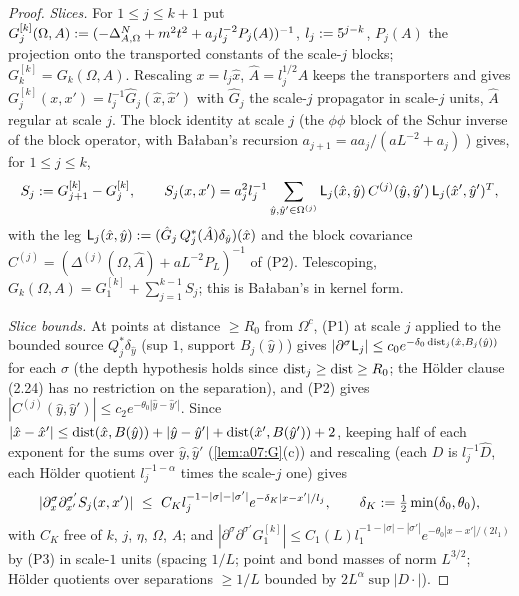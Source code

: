 \begin{proof}
\emph{Slices.} For $1\le j\le k+1$ put $G^{[k]}_j(\Omega,A):=(-\Delta^N_{A,\Omega}+m^2t^2+a_jl_j^{-2}P_j(A))^{-1}$, $l_j:=5^{j-k}$, $P_j(A)$ the projection onto the transported constants of the scale-$j$ blocks; $G^{[k]}_k=G_k(\Omega,A)$. Rescaling $x=l_j\hat x$, $\hat A=l_j^{1/2}A$ keeps the transporters and gives $G^{[k]}_j(x,x')=l_j^{-1}\hat G_j(\hat x,\hat x')$ with $\hat G_j$ the scale-$j$ propagator in scale-$j$ units, $\hat A$ regular at scale $j$. The block identity at scale $j$ (the $\phi\phi$ block of the Schur inverse of the block operator, with Ba{\l}aban's recursion $a_{j+1}=aa_j/(aL^{-2}+a_j)$ \cite[p.~609]{Ba1}) gives, for $1\le j\le k$,
\[
S_j:= G^{[k]}_{j+1}-G^{[k]}_j,\qquad S_j(x,x')=a_j^2l_j^{-1}\sum_{\hat y,\hat y'\in\Omega^{(j)}}\mathsf L_j(\hat x,\hat y)\,C^{(j)}(\hat y,\hat y')\,\mathsf L_j(\hat x',\hat y')^{T},
\]
with the leg $\mathsf L_j(\hat x,\hat y):=(\hat G_j\,Q_j^*(\hat A)\delta_{\hat y})(\hat x)$ and the block covariance $C^{(j)}=(\Delta^{(j)}(\Omega,\hat A)+aL^{-2}P_L)^{-1}$ of (P2). Telescoping, $G_k(\Omega,A)=G^{[k]}_1+\sum_{j=1}^{k-1}S_j$; this is Ba{\l}aban's \cite[(2.6), p.~424]{Ba3} in kernel form.

\emph{Slice bounds.} At points at distance $\ge R_0$ from $\Omega^c$, (P1) at scale $j$ applied to the bounded source $Q_j^*\delta_{\hat y}$ (sup $1$, support $B_j(\hat y)$) gives $|\partial^\sigma\mathsf L_j|\le c_0e^{-\delta_0\operatorname{dist}_j(\hat x,B_j(\hat y))}$ for each $\sigma$ (the depth hypothesis holds since $\operatorname{dist}_j\ge\operatorname{dist}\ge R_0$; the H\"older clause (2.24) has no restriction on the separation), and (P2) gives $|C^{(j)}(\hat y,\hat y')|\le c_2e^{-\theta_0|\hat y-\hat y'|}$. Since $|\hat x-\hat x'|\le\operatorname{dist}(\hat x,B(\hat y))+|\hat y-\hat y'|+\operatorname{dist}(\hat x',B(\hat y'))+2$, keeping half of each exponent for the sums over $\hat y,\hat y'$ (\cref{lem:a07:G}(c)) and rescaling (each $D$ is $l_j^{-1}\hat D$, each H\"older quotient $l_j^{-1-\alpha}$ times the scale-$j$ one) gives
\[
|\partial^\sigma_x\partial^{\sigma'}_{x'}S_j(x,x')|\ \le\ C_Kl_j^{-1-|\sigma|-|\sigma'|}e^{-\delta_K|x-x'|/l_j},\qquad\delta_K\defeq\tfrac12\min(\delta_0,\theta_0),
\]
with $C_K$ free of $k$, $j$, $\eta$, $\Omega$, $A$; and $|\partial^\sigma\partial^{\sigma'}G^{[k]}_1|\le C_1(L)l_1^{-1-|\sigma|-|\sigma'|}e^{-\theta_0|x-x'|/(2l_1)}$ by (P3) in scale-$1$ units (spacing $1/L$; point and bond masses of norm $L^{3/2}$; H\"older quotients over separations $\ge1/L$ bounded by $2L^\alpha\sup|D\cdot|$).


\end{proof}
